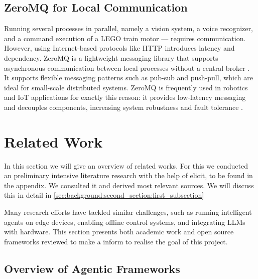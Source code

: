 \subsection{ZeroMQ for Local Communication}
\label{subsec:background:first_section:third_subsection}

Running several processes in parallel, namely a vision system, a voice recognizer, and a command execution of a LEGO train motor — requires communication. However, using Internet-based protocols like HTTP introduces latency and dependency. ZeroMQ is a lightweight messaging library that supports asynchronous communication between local processes without a central broker \cite{hintjens_zeromq_2013}. It supports flexible messaging patterns such as pub-sub and push-pull, which are ideal for small-scale distributed systems. ZeroMQ is frequently used in robotics and IoT applications for exactly this reason: it provides low-latency messaging and decouples components, increasing system robustness and fault tolerance \cite{wang_survey_2024, zhang-kennedy_systematic_2021}.


%
%

\section{Related Work}
\label{sec:background:second_section} 

In this section we will give an overview of related works. For this we conducted an preliminary intensive literature research with the help of elicit, to be found in the appendix. We consulted it and derived most relevant sources. We will discuss this in detail in \ref{sec:background:second_section:first_subsection} 

Many research efforts have tackled similar challenges, such as running intelligent agents on edge devices, enabling offline control systems, and integrating LLMs with hardware. This section presents both academic work and open source frameworks reviewed to make a inform to realise the goal of this project.

\subsection{Overview of Agentic Frameworks}
\label{subsec:background:first_section:first_subsection}

